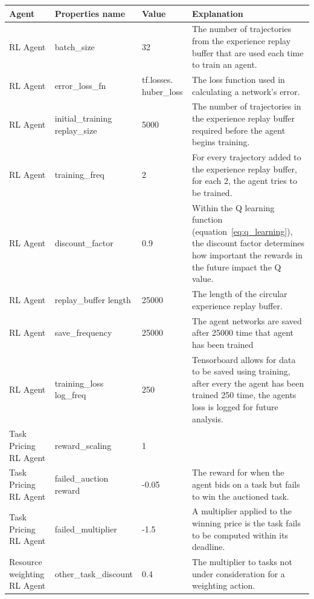 \begin{longtable}{|p{2cm}|p{3.5cm}|p{2.5cm}|p{6cm}|} \hline
    \textbf{Agent} & \textbf{Properties name} & \textbf{Value} & \textbf{Explanation} \\ \hline
        RL Agent & batch\_size & 32 & The number of trajectories from the experience replay buffer that are used each
            time to train an agent. \\ \hline
        RL Agent & error\_loss\_fn & tf.losses. huber\_loss & The loss function used in calculating a network's error. \\ \hline
        RL Agent & initial\_training replay\_size & 5000 & The number of trajectories in the experience replay buffer
            required before the agent begins training. \\ \hline
        RL Agent & training\_freq & 2 & For every trajectory added to the experience replay buffer, for each 2, the
            agent tries to be trained. \\ \hline
        RL Agent & discount\_factor & 0.9 & Within the Q learning function (equation~\eqref{eq:q_learning}), the
            discount factor determines how important the rewards in the future impact the Q value. \\ \hline
        RL Agent & replay\_buffer length & 25000 & The length of the circular experience replay buffer. \\ \hline
        RL Agent & save\_frequency & 25000 & The agent networks are saved after 25000 time that agent has been trained
            \\ \hline
        RL Agent & training\_loss log\_freq & 250 & Tensorboard allows for data to be saved using training, after every
            the agent has been trained 250 time, the agents loss is logged for future analysis. \\ \hline
        Task Pricing RL Agent & reward\_scaling & 1 & \\ \hline
        Task Pricing RL Agent & failed\_auction reward & -0.05 & The reward for when the agent bids on a task but fails
            to win the auctioned task. \\ \hline
        Task Pricing RL Agent & failed\_multiplier & -1.5 & A multiplier applied to the winning price is the task fails
            to be computed within its deadline. \\ \hline
        Resource weighting RL Agent & other\_task\_discount & 0.4 & The multiplier to tasks not under consideration for
            a weighting action. \\ \hline

\end{longtable}
